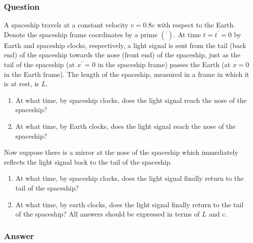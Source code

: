 \subsubsection{Question}
A spaceship travels at a constant velocity $v = 0.8c$ with respect to the Earth. Denote the spaceship frame coordinates by a prime $( ^\prime )$. At time $t = t^\prime = 0$ by Earth and spaceship clocks, respectively, a light signal is sent from the tail (back end) of the spaceship towards the nose (front end) of the spaceship, just as the tail of the spaceship (at $x^\prime = 0$ in the spaceship frame) passes the Earth (at $x = 0$ in the Earth frame). The length of the spaceship, measured in a frame in which it is at rest, is $L$.
\begin{enumerate}
	\item At what time, by spaceship clocks, does the light signal reach the nose of the spaceship?
	\item At what time, by Earth clocks, does the light signal reach the nose of the spaceship?
\end{enumerate}
Now suppose there is a mirror at the nose of the spaceship which immediately reflects the light signal back to the tail of the spaceship.
\begin{enumerate}
	\item At what time, by spaceship clocks, does the light signal finally return to the tail of the spaceship?
	\item At what time, by earth clocks, does the light signal finally return to the tail of the spaceship? All answers should be expressed in terms of $L$ and $c$.
\end{enumerate}

\subsubsection{Answer}

